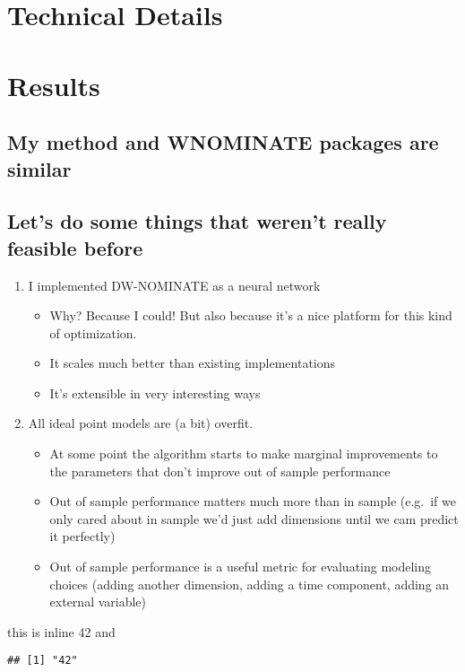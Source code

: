 \documentclass[11pt,]{article}
\newenvironment{Shaded}{\begin{snugshade}}{\end{snugshade}}
\newcommand{\OperatorTok}[1]{\textcolor[rgb]{0.81,0.36,0.00}{\textbf{#1}}}
\newcommand{\NormalTok}[1]{#1}
\providecommand{\tightlist}{%
\setlength{\itemsep}{0pt}\setlength{\parskip}{0pt}}
\begin{document}
\section{Technical Details}\label{technical-details}

\section{Results}\label{results}

\subsection{My method and WNOMINATE packages are
similar}\label{my-method-and-wnominate-packages-are-similar}

\subsection{Let's do some things that weren't really feasible
before}\label{lets-do-some-things-that-werent-really-feasible-before}

\begin{enumerate}
\def\labelenumi{\arabic{enumi}.}
\tightlist
\item
  I implemented DW-NOMINATE as a neural network

  \begin{itemize}
  \tightlist
  \item
    Why? Because I could! But also because it's a nice platform for this
    kind of optimization.
  \item
    It scales much better than existing implementations
  \item
    It's extensible in very interesting ways
  \end{itemize}
\item
  All ideal point models are (a bit) overfit.

  \begin{itemize}
  \tightlist
  \item
    At some point the algorithm starts to make marginal improvements to
    the parameters that don't improve out of sample performance
  \item
    Out of sample performance matters much more than in sample (e.g.~if
    we only cared about in sample we'd just add dimensions until we cam
    predict it perfectly)
  \item
    Out of sample performance is a useful metric for evaluating modeling
    choices (adding another dimension, adding a time component, adding
    an external variable)
  \end{itemize}
\end{enumerate}

this is inline 42 and

\begin{Shaded}
\end{Shaded}

\begin{verbatim}
## [1] "42"
\end{verbatim}




\newpage
\singlespacing 
\end{document}
